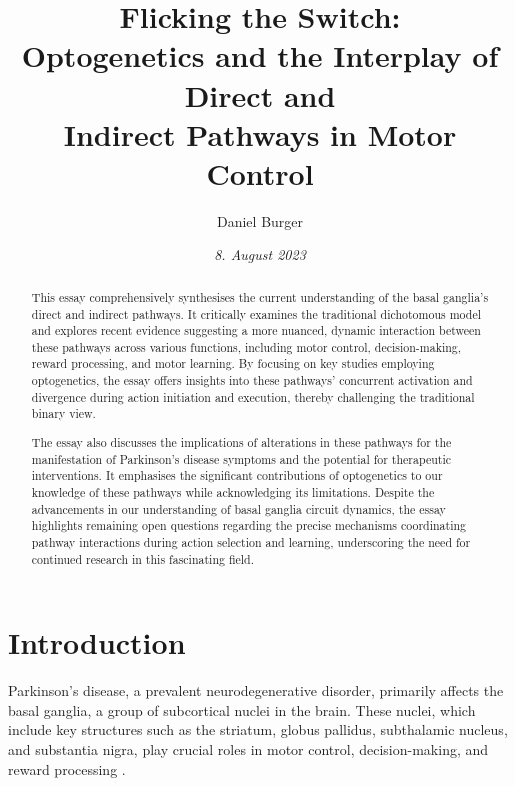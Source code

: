 \documentclass[10pt]{article}
\title{\textbf{Flicking the Switch: } \\ Optogenetics and the Interplay of Direct and \\ Indirect Pathways in Motor Control}
\author[ ]{Daniel Burger}
\affil[ ]{\textbf{King’s College London}}
\affil[ ]{\href{mailto:public@danielburger.online}{public@danielburger.online}}
\date{\textit{8. August 2023}}
\begin{document}

\maketitle
\thispagestyle{empty}


\begin{sloppypar} %
  \begin{abstract}
    This essay comprehensively synthesises the current understanding of the basal ganglia’s direct and indirect pathways. It critically examines the traditional dichotomous model and explores recent evidence suggesting a more nuanced, dynamic interaction between these pathways across various functions, including motor control, decision-making, reward processing, and motor learning. By focusing on key studies employing optogenetics, the essay offers insights into these pathways’ concurrent activation and divergence during action initiation and execution, thereby challenging the traditional binary view.

    The essay also discusses the implications of alterations in these pathways for the manifestation of Parkinson’s disease symptoms and the potential for therapeutic interventions. It emphasises the significant contributions of optogenetics to our knowledge of these pathways while acknowledging its limitations. Despite the advancements in our understanding of basal ganglia circuit dynamics, the essay highlights remaining open questions regarding the precise mechanisms coordinating pathway interactions during action selection and learning, underscoring the need for continued research in this fascinating field.
  \end{abstract}
  \pagebreak

  \tableofcontents
  \pagebreak

  \listoffigures
  \pagebreak



  \section{Introduction}
  \label{sec:introduction}

  Parkinson’s disease, a prevalent neurodegenerative disorder, primarily affects the basal ganglia, a group of subcortical nuclei in the brain. These nuclei, which include key structures such as the striatum, globus pallidus, subthalamic nucleus, and substantia nigra, play crucial roles in motor control, decision-making, and reward processing \citep{zhang_oculomotor_2018, ojagbemi_neuropsychiatric_2013}.


\end{sloppypar}
\end{document}

